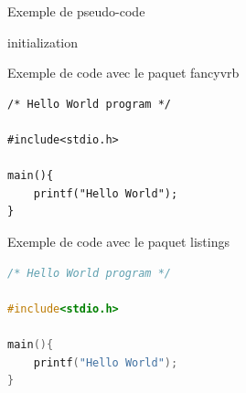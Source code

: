 \clearpage

Exemple de pseudo-code
\begin{algorithm}[htbp]
initialization\;
\caption{Comment écrire des pseudo-codes}
\end{algorithm}

\clearpage

Exemple de code avec le paquet fancyvrb
\begin{Verbatim}[frame=single]
/* Hello World program */

#include<stdio.h>

main(){
    printf("Hello World");
}
\end{Verbatim}

Exemple de code avec le paquet listings

\vspace{18pt}
\begin{lstlisting}[language={C++},basicstyle={\small\ttfamily},showstringspaces=false,tabsize=5,frame=single]
/* Hello World program */

#include<stdio.h>

main(){
    printf("Hello World");
}
\end{lstlisting}